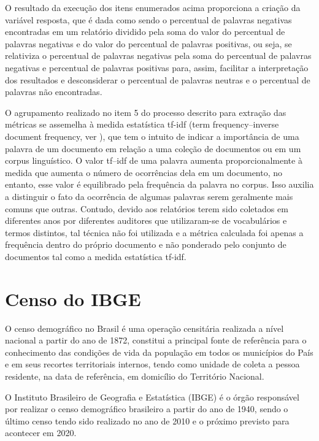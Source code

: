 O resultado da execução dos itens enumerados acima proporciona a criação da variável resposta, que é dada como sendo o percentual de palavras negativas encontradas em um relatório dividido pela soma do valor do percentual de palavras negativas e do valor do percentual de palavras positivas, ou seja, se relativiza o percentual de palavras negativas pela soma do percentual de palavras negativas e percentual de palavras positivas para, assim, facilitar a interpretação dos resultados e desconsiderar o percentual de palavras neutras e o percentual de palavras não encontradas.

O agrupamento realizado no item 5 do processo descrito para extração das métricas se assemelha à medida estatística tf-idf (term frequency–inverse document frequency, ver \citet{Jones1972}), que tem o intuito de indicar a importância de uma palavra de um documento em relação a uma coleção de documentos ou em um corpus linguístico. O valor tf–idf de uma palavra aumenta proporcionalmente à medida que aumenta o número de ocorrências dela em um documento, no entanto, esse valor é equilibrado pela frequência da palavra no corpus. Isso auxilia a distinguir o fato da ocorrência de algumas palavras serem geralmente mais comuns que outras. Contudo, devido aos relatórios terem sido coletados em diferentes anos por diferentes auditores que utilizaram-se de vocabulários e termos distintos, tal técnica não foi utilizada e a métrica calculada foi apenas a frequência dentro do próprio documento e não ponderado pelo conjunto de documentos tal como a medida estatística tf-idf.

\section{Censo do IBGE}
\label{sec:censo_do_ibge}

O censo demográfico no Brasil é uma operação censitária realizada a nível nacional a partir do ano de 1872, constitui a principal fonte de referência para o conhecimento das condições de vida da população em todos os municípios do País e em seus recortes territoriais internos, tendo como unidade de coleta a pessoa residente, na data de referência, em domicílio do Território Nacional.

O Instituto Brasileiro de Geografia e Estatística (IBGE) é o órgão responsável por realizar o censo demográfico brasileiro a partir do ano de 1940, sendo o último censo tendo sido realizado no ano de 2010 e o próximo previsto para acontecer em 2020.

